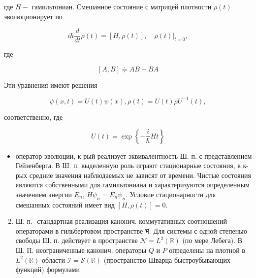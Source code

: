 \documentclass[10pt]{article}
\begin{document}
где $H-$ гамильтониан. Смешанное состояние с матрицей плотности $\rho(t)$ эволюционирует по



\[

i \hbar \frac{d}{d t} \rho(t)=[H, \rho(t)],\left.\quad \rho(t)\right|_{t=0},

\]



где



\[

[A, B] \doteqdot A B-B A

\]



Эти уравнения имеют решения



\[

\psi(x, t)=U(t) \psi(x), \rho(t)=U(t) \rho U^{-1}(t),

\]



соответственно, где



\[

U(t)=\exp \left\{-\frac{i}{\hbar} H t\right\}

\]



\begin{itemize}

  \item оператор эволюции, к-рый реализует эквивалентность Ш. п. с представлением Гейзенберга. В Ш. п. выделенную роль играют стационарные состояния, в к-рых средние значения наблюдаемых не зависят от времени. Чистые состояния являются собственными для гамильтониана и характеризуются определенным значением энергии $E_{n}$, $H \psi_{n}=E_{n} \psi_{n}$. Условие стационарности для смешанных состояний имеет вид $[H, \rho(t)]=0$.

\end{itemize}



\begin{enumerate}

  \setcounter{enumi}{1}

  \item Ш. п.- стандартная реализация канонич. коммутативных соотношений операторами в гильбертовом пространстве भ. Для системы с одной степенью свободы Ш. п. действует в пространстве $\mathscr{N}=L^{2}(\mathbb{R})$ (по мере Лебега). В Ш. П. неограниченные канонич. операторы $Q$ и $P$ определены на плотной в $L^{2}(\mathbb{R})$ области $\mathscr{I}=\mathscr{S}(\mathbb{R})$ (пространство Шварца быстроубывающих функций) формулами

\end{enumerate}
\end{document}
